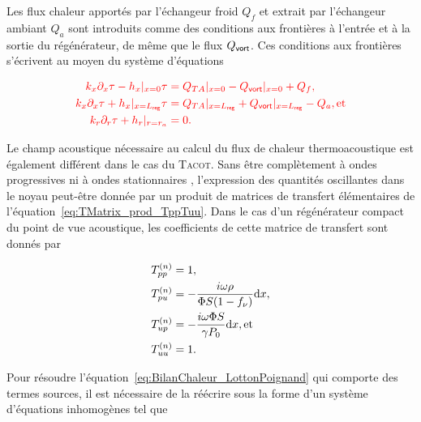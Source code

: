 Les flux chaleur apportés par l'échangeur froid $Q_f$ et extrait par l'échangeur ambiant $Q_a$ sont introduits comme des conditions aux frontières à l'entrée et à la sortie du régénérateur, de même que le flux $Q_{\sf vort}$. Ces conditions aux frontières s'écrivent au moyen du système d'équations

\begin{subequations} \color{red}
	\begin{align}
		k_x \partial_x \tau - h_{x}|_{x=0}\tau &= Q_{TA}|_{x=0} - Q_{\sf vort}|_{x=0} + Q_f, \label{eq:CondFront_x_0Froid}\\
		k_x \partial_x \tau + h_{x}|_{x=L_{\sf reg}}\tau &= Q_{TA}|_{x=L_{\sf reg}}  + Q_{\sf vort}|_{x=L_{\sf reg}} - Q_a, \text{et} \label{eq:CondFront_x_LregAmb}\\
		k_r \partial_r \tau + h_{r}|_{r=r_a} &= 0. \label{eq:CondFront_r_ra}
	\end{align}
	\label{eq:CondFront}%
\end{subequations}



Le champ acoustique nécessaire au calcul du flux de chaleur thermoacoustique est également différent dans le cas du \textsc{Tacot}. Sans être complètement \og à ondes progressives \fg{} ni \og à ondes stationnaires \fg{}, l'expression des quantités oscillantes dans le noyau peut-être donnée par un produit de matrices de transfert élémentaires de l'équation~\eqref{eq:TMatrix_prod_TppTuu}. Dans le cas d'un régénérateur compact du point de vue acoustique, les coefficients de cette matrice de transfert sont donnés par

\begin{subequations}
	\begin{align}
		T_{pp}^{(n)} &= 1, \label{eq:TMatrix_Tpp_regen}\\
		T_{pu}^{(n)} &= -\frac{i \omega \rho}{\Phi S (1-f_\nu)}\mathrm{d} x, \label{eq:TMatrix_Tpu_regen}\\
		T_{up}^{(n)} &= -\frac{i \omega \Phi S}{\gamma P_0} \mathrm{d} x, \text{et} \label{eq:TMatrix_Tup_regen}\\
		T_{uu}^{(n)} &= 1. \label{eq:TMatrix_Tuu_regen}
	\end{align}
	\label{eq:TMatrix_regen}
\end{subequations}

Pour résoudre l'équation~\eqref{eq:BilanChaleur_LottonPoignand} qui comporte des termes sources, il est nécessaire de la réécrire sous la forme d'un système d'équations inhomogènes tel que

